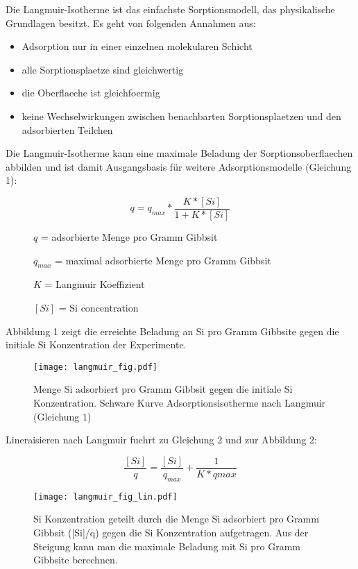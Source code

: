 \documentclass[12pt]{amsart}
\begin{document}
Die Langmuir-Isotherme ist das einfachste Sorptionsmodell, das physikalische Grundlagen besitzt. 
Es geht von folgenden Annahmen aus:

\begin{itemize}
\item Adsorption nur in einer einzelnen molekularen Schicht
\item alle Sorptionsplaetze sind gleichwertig
\item die Oberflaeche ist gleichfoermig 
\item keine Wechselwirkungen zwischen benachbarten Sorptionsplaetzen und den adsorbierten Teilchen
\end{itemize}

Die Langmuir-Isotherme kann eine maximale Beladung der Sorptionsoberflaechen abbilden und ist damit Ausgangsbasis für weitere Adsorptionsmodelle (Gleichung 1):

\begin{equation}
q=q_{max}*\frac{K*[Si]}{1+K*[Si]}
\end{equation}

\begin{description}
\item[ ] $q$ = adsorbierte Menge pro Gramm Gibbsit
\item[ ] $q_{max}$ = maximal adsorbierte Menge pro Gramm Gibbsit
\item[ ]$K$ = Langmuir Koeffizient	
\item[ ]$[Si]$ = Si concentration
\end{description}

\bigskip

Abbildung 1 zeigt die erreichte Beladung an Si pro Gramm Gibbsite gegen die initiale Si Konzentration der Experimente.
\begin{figure}[htbp]
\begin{center}
\texttt{[image: langmuir\_fig.pdf]}
\caption{Menge Si adsorbiert pro Gramm Gibbsit gegen die initiale Si Konzentration. Schware Kurve Adsorptionsisotherme nach Langmuir (Gleichung 1)}
\label{default}
\end{center}
\end{figure}


Lineraisieren nach Langmuir fuehrt zu Gleichung 2 und zur Abbildung 2:

\begin{equation}
\frac{[Si]}{q}=\frac{[Si]}{q_{max}}+\frac{1}{K*q{max}}
\end{equation}

\begin{figure}[htbp]
\begin{center}
\texttt{[image: langmuir\_fig\_lin.pdf]}
\caption{Si Konzentration geteilt durch die Menge Si adsorbiert pro Gramm Gibbsit ([Si]/q) gegen die Si Konzentration aufgetragen. Aus der Steigung kann man die maximale Beladung mit Si pro Gramm Gibbsite berechnen. }
\label{default}
\end{center}
\end{figure}
\end{document}
